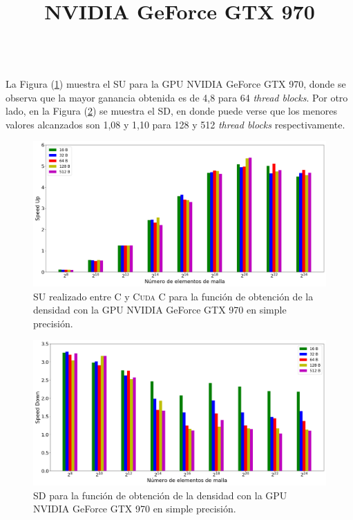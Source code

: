 \newpage
%
\title{\textbf{NVIDIA GeForce GTX 970}}\\

La Figura (\ref{fig:s_cuda_970_test_simple_10}) muestra el SU para la GPU NVIDIA GeForce GTX 970, donde se observa que la mayor ganancia obtenida es de 4,8 para 64 \textit{thread blocks}. Por otro lado, en la Figura (\ref{fig:s_py_970_test_simple_10}) se muestra el SD, en donde puede verse que los menores valores alcanzados son 1,08 y 1,10 para 128 y 512  \textit{thread blocks} respectivamente.


\begin{figure}[h!]
	\centering
	\includegraphics[width=\textwidth]{figs_2/cap4/s_cuda_970_test_simple_10}
	\caption{SU realizado entre \textsc{C} y \textsc{Cuda C} para la función de obtención de la densidad con la GPU NVIDIA GeForce GTX 970 en simple precisión.} 
	\label{fig:s_cuda_970_test_simple_10}	
\end{figure}

\begin{figure}[h!]
	\centering
	\includegraphics[width=\textwidth]{figs_2/cap4/s_py_970_test_simple_10}
	\caption{SD para la función de obtención de la densidad con la GPU NVIDIA GeForce GTX 970 en simple precisión.} 
	\label{fig:s_py_970_test_simple_10}	
\end{figure}


